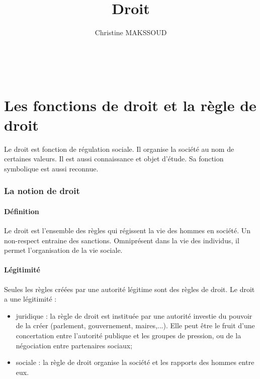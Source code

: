 \documentclass[11pt]{article}
\begin{document}
    \title{Droit}
    \author{Christine MAKSSOUD}
    \date{}

\maketitle
\setcounter{page}{0} \thispagestyle{empty} %
\newpage
\setcounter{page}{2} %

\newpage
~\\
\renewcommand{\contentsname}{Sommaire}
\tableofcontents

\newpage
\part{Les fonctions de droit et la règle de droit}
	Le droit est fonction de régulation sociale. Il organise la société au nom de certaines valeurs. Il est aussi connaissance et objet d'étude. Sa fonction symbolique est aussi reconnue.
	
	\section{La notion de droit}
		\subsection{Définition}
			Le droit est l'ensemble des règles qui régissent la vie des hommes en société. Un non-respect entraine des sanctions. Omniprésent dans la vie des individus, il permet l'organisation de la vie sociale.
			
		\subsection{Légitimité}
			Seules les règles créées par une autorité légitime sont des règles de droit. Le droit a une légitimité :
				\begin{itemize}
					\item juridique : la règle de droit est instituée par une autorité investie du pouvoir de la créer (parlement, gouvernement, maires,...). Elle peut être le fruit d'une concertation entre l'autorité publique et les groupes de pression, ou de la négociation entre partenaires sociaux;
					\item sociale : la règle de droit organise la société et les rapports des hommes entre eux.
				\end{itemize}
				
\end{document}
